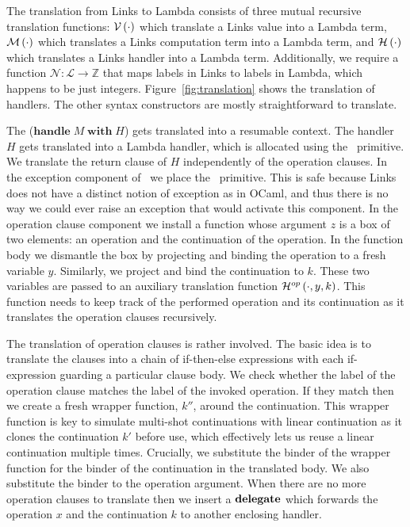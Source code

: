\documentclass[12pt,mscres,cdtppar,twoside,openright,logo,rightchapter,normalheadings]{infthesis}
\theoremstyle{definition}
\newcommand{\keyw}[1]{\textbf{#1}}
\newcommand{\Handle}{\keyw{handle}}
\newcommand{\With}{\keyw{with}}
\begin{document}
The translation from Links to Lambda consists of three mutual
recursive translation functions: $\mathcal{V}\left(\cdot\right)$ which translate a
Links value into a Lambda term, $\mathcal{M}\left(\cdot\right)$ which translates a
Links computation term into a Lambda term, and $\mathcal{H}\left(\cdot\right)$ which
translates a Links handler into a Lambda term. Additionally, we
require a function $\mathcal{N} : \mathcal{L} \to \mathbb{Z}$ that
maps labels in Links to labels in Lambda, which happens to be just
integers.  Figure~\ref{fig:translation} shows the translation of
handlers. The other syntax constructors are mostly straightforward to
translate.

The ($\Handle\; M \; \With\; H$) gets translated into a resumable
context. The handler $H$ gets translated into a Lambda handler, which
is allocated using the \Alloc\ primitive. We translate the return
clause of $H$ independently of the operation clauses. In the exception
component of \Alloc\ we place the \Error\ primitive. This is safe
because Links does not have a distinct notion of exception as in
OCaml, and thus there is no way we could ever raise an exception that
would activate this component. 
%
In the operation clause component we install a function whose argument
$z$ is a box of two elements: an operation and the continuation of the
operation. In the function body we dismantle the box by projecting and
binding the operation to a fresh variable $y$. Similarly, we project
and bind the continuation to $k$. These two variables are passed to an
auxiliary translation function $\mathcal{H}^{op}\left(\cdot,y,k\right)$. This function
needs to keep track of the performed operation and its continuation as
it translates the operation clauses recursively.

The translation of operation clauses is rather involved. The basic
idea is to translate the clauses into a chain of if-then-else
expressions with each if-expression guarding a particular clause
body. We check whether the label of the operation clause matches the
label of the invoked operation. If they match then we create a fresh
wrapper function, $k''$, around the continuation. This wrapper
function is key to simulate multi-shot continuations with linear
continuation as it clones the continuation $k'$ before use, which
effectively lets us reuse a linear continuation multiple
times. Crucially, we substitute the binder of the wrapper function for
the binder of the continuation in the translated body. We also
substitute the binder to the operation argument. When there are no
more operation clauses to translate then we insert a $\Delegate$ which
forwards the operation $x$ and the continuation $k$ to another
enclosing handler.
\end{document}
